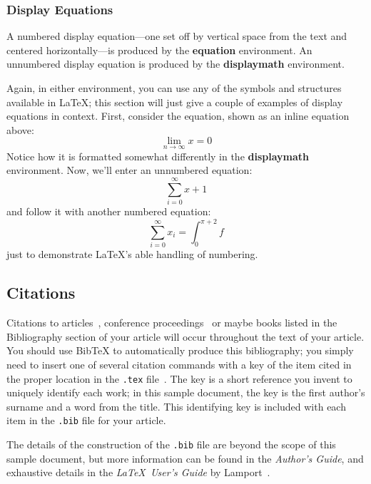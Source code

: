 \iffalse%
\subsubsection{Display Equations}
A numbered display equation---one set off by vertical space from the
text and centered horizontally---is produced by the \textbf{equation}
environment. An unnumbered display equation is produced by the
\textbf{displaymath} environment.

Again, in either environment, you can use any of the symbols
and structures available in \LaTeX\@; this section will just
give a couple of examples of display equations in context.
First, consider the equation, shown as an inline equation above:
\begin{equation}
  \lim_{n\rightarrow \infty}x=0
\end{equation}
Notice how it is formatted somewhat differently in
the \textbf{displaymath}
environment.  Now, we'll enter an unnumbered equation:
\begin{displaymath}
  \sum_{i=0}^{\infty} x + 1
\end{displaymath}
and follow it with another numbered equation:
\begin{equation}
  \sum_{i=0}^{\infty}x_i=\int_{0}^{\pi+2} f
\end{equation}
just to demonstrate \LaTeX's able handling of numbering.

\subsection{Citations}
Citations to articles~\cite{bowman:reasoning,
clark:pct, braams:babel, herlihy:methodology},
conference proceedings~\cite{clark:pct} or maybe
books \cite{Lamport:LaTeX, salas:calculus} listed
in the Bibliography section of your
article will occur throughout the text of your article.
You should use BibTeX to automatically produce this bibliography;
you simply need to insert one of several citation commands with
a key of the item cited in the proper location in
the \texttt{.tex} file~\cite{Lamport:LaTeX}.
The key is a short reference you invent to uniquely
identify each work; in this sample document, the key is
the first author's surname and a
word from the title.  This identifying key is included
with each item in the \texttt{.bib} file for your article.

The details of the construction of the \texttt{.bib} file
are beyond the scope of this sample document, but more
information can be found in the \textit{Author's Guide},
and exhaustive details in the \textit{\LaTeX\ User's
Guide} by Lamport~.

